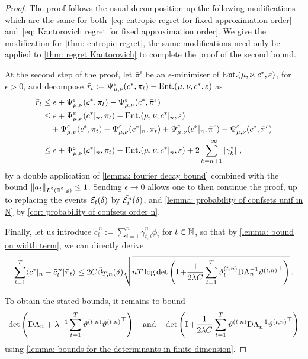 \begin{proof}
    The proof follows the usual decomposition up the following modifications which are the same for both~\eqref{eq: entropic regret for fixed approximation order} and~\eqref{eq: Kantorovich regret for fixed approximation order}. We give the modification for \cref{thm: entropic regret}, the same modifications need only be applied to \cref{thm: regret Kantorovich} to complete the proof of the second bound.  

    At the second step of the proof, let $\bar\pi^{\epsilon}$ be an $\epsilon$-minimiser of $\text{Ent.}(\mu,\nu,c^*,\varepsilon)$, for $\epsilon>0$, and decompose $\bar r_t := \Psi_{\mu,\nu}^\varepsilon (c^*,\pi_t)-\text{Ent.}(\mu,\nu,c^*,\varepsilon)$ as
    \begin{align}
        \bar r_t &\le  \epsilon + \entf (c^*,\pi_t) - \entf(c^*, \bar\pi^{\epsilon})\notag \\
        & \le \epsilon +\entf (c^*\vert_n,\pi_t) - \ent(\mu,\nu,c^*\vert_n,\ve) \notag \\
        &\quad +\entf (c^*,\pi_t) -\entf (c^*\vert_n,\pi_t)  + \entf(c^*\vert_n, \bar\pi^{\epsilon})- \entf(c^*, \bar\pi^{\epsilon})\notag \\%
        &\le \epsilon +\entf (c^*\vert_n,\pi_t) - \ent(\mu,\nu,c^*\vert_n,\ve) + 2\sum_{k=n+1}^{+\infty}\abs{\gamma_k^*}\,,\notag
    \end{align}
    by a double application of \cref{lemma: fourier decay bound} combined with the bound $\left\lVert a_t\right\rVert_{L^2(\mathbb{R}^2;\varrho)}\le 1$. 
    Sending $\epsilon\to0$ allows one to then continue the proof, up to replacing the events $\mathcal{E}_t(\delta)$ by $\tilde{\mathcal{E}_t^{n}}(\delta)$, and \cref{lemma: probability of confsets unif in N} by \cref{cor: probability of confsets order n}. 

    Finally, let us introduce $\tilde c_t^{\,n}:= \sum_{i=1}^n \tilde\gamma_{t,i}^{n}\phi_i$ for $t\in\mathbb{N}$, so that by \cref{lemma: bound on width term}, we can directly derive
    \begin{align}
        \sum_{t=1}^T\langle c^*\vert_n -\tilde c_t^{\,n}\vert \tilde\pi_t\rangle\le 2C\tilde{\beta}_{T,n}(\delta)\sqrt{nT\log\det\left(\operatorname{\boldmath{I}}+\frac{1}{2\lambda C}\sum_{t=1}^T \vartheta^{(t,n)}_t\mathrm{D}\Lambda_n^{-1}{\vartheta^{(t,n)}}^\top\right)}\,.\notag
    \end{align}

    To obtain the stated bounds, it remains to bound 
    \[
        \det\left(\mathrm{D}\Lambda_n+\lambda^{-1}\sum_{t=1}^T \vartheta^{(t,n)}{\vartheta^{(t,n)}}^\top\right) \quad\mbox{and}\quad \det\left(\operatorname{\boldmath{I}}+\frac{1}{2\lambda C}\sum_{t=1}^T \vartheta^{(t,n)}\mathrm{D}\Lambda_n^{-1}{\vartheta^{(t,n)}}^\top\right)
    \]
    using \cref{lemma: bounds for the determinants in finite dimension}.
\end{proof}


